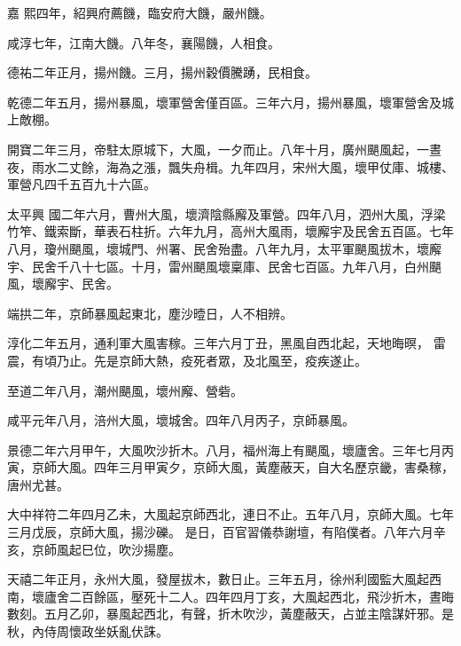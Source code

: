 \begin{pinyinscope}
 嘉
 熙四年，紹興府薦饑，臨安府大饑，嚴州饑。



 咸淳七年，江南大饑。八年冬，襄陽饑，人相食。



 德祐二年正月，揚州饑。三月，揚州穀價騰踴，民相食。



 乾德二年五月，揚州暴風，壞軍營舍僅百區。三年六月，揚州暴風，壞軍營舍及城上敵棚。



 開寶二年三月，帝駐太原城下，大風，一夕而止。八年十月，廣州颶風起，一晝夜，雨水二丈餘，海為之漲，飄失舟楫。九年四月，宋州大風，壞甲仗庫、城樓、軍營凡四千五百九十六區。



 太平興
 國二年六月，曹州大風，壞濟陰縣廨及軍營。四年八月，泗州大風，浮梁竹笮、鐵索斷，華表石柱折。六年九月，高州大風雨，壞廨宇及民舍五百區。七年八月，瓊州颶風，壞城門、州署、民舍殆盡。八年九月，太平軍颶風拔木，壞廨宇、民舍千八十七區。十月，雷州颶風壞稟庫、民舍七百區。九年八月，白州颶風，壞廨宇、民舍。



 端拱二年，京師暴風起東北，塵沙曀日，人不相辨。



 淳化二年五月，通利軍大風害稼。三年六月丁丑，黑風自西北起，天地晦暝，
 雷震，有頃乃止。先是京師大熱，疫死者眾，及北風至，疫疾遂止。



 至道二年八月，潮州颶風，壞州廨、營砦。



 咸平元年八月，涪州大風，壞城舍。四年八月丙子，京師暴風。



 景德二年六月甲午，大風吹沙折木。八月，福州海上有颶風，壞廬舍。三年七月丙寅，京師大風。四年三月甲寅夕，京師大風，黃塵蔽天，自大名歷京畿，害桑稼，唐州尤甚。



 大中祥符二年四月乙未，大風起京師西北，連日不止。五年八月，京師大風。七年三月戊辰，京師大風，揚沙礫。
 是日，百官習儀恭謝壇，有陷僕者。八年六月辛亥，京師風起巳位，吹沙揚塵。



 天禧二年正月，永州大風，發屋拔木，數日止。三年五月，徐州利國監大風起西南，壞廬舍二百餘區，壓死十二人。四年四月丁亥，大風起西北，飛沙折木，晝晦數刻。五月乙卯，暴風起西北，有聲，折木吹沙，黃塵蔽天，占並主陰謀奸邪。是秋，內侍周懷政坐妖亂伏誅。




\end{pinyinscope}
